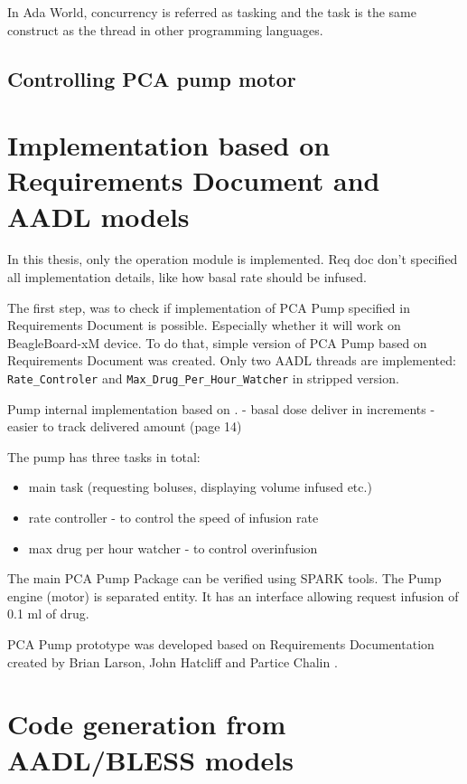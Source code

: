 In Ada World, concurrency is referred as tasking and the task is the same construct as the thread in other programming languages. 


\subsection{Controlling PCA pump motor}
\label{pcapumpimpl:beagleboard:pcapumpmotor}





\section{Implementation based on Requirements Document and AADL models}
\label{pcapumpimpl:manual}

In this thesis, only the operation module is implemented. Req doc don't specified all implementation details, like how basal rate should be infused.

The first step, was to check if implementation of PCA Pump specified in Requirements Document is possible. Especially whether it will work on BeagleBoard-xM device. To do that, simple version of PCA Pump based on Requirements Document was created. Only two AADL threads are implemented: \lstinline{Rate_Controler} and \lstinline{Max_Drug_Per_Hour_Watcher} in stripped version.

Pump internal implementation based on \cite{CADD-PrizmAmbulatoryInfusionPump:Online}.
- basal dose deliver in increments - easier to track delivered amount (page 14)

The pump has three tasks in total:
\begin{itemize}
    \item main task (requesting boluses, displaying volume infused etc.)
    \item rate controller - to control the speed of infusion rate
    \item max drug per hour watcher - to control overinfusion
\end{itemize}

The main PCA Pump Package can be verified using SPARK tools. The Pump engine (motor) is separated entity. It has an interface allowing request infusion of 0.1 ml of drug.

PCA Pump prototype was developed based on Requirements Documentation created by Brian Larson, John Hatcliff and Partice Chalin \cite{PcaReq}.


\section{Code generation from AADL/BLESS models}
\label{pcapumpimpl:codegen}

